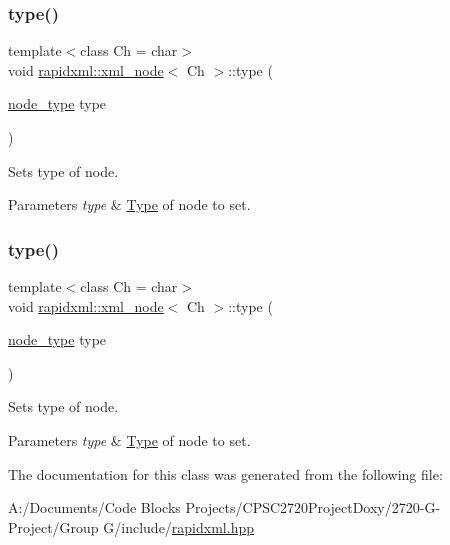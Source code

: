 \subsubsection{\texorpdfstring{type()}{type()}\hspace{0.1cm}{\footnotesize\ttfamily [3/4]}}
{\footnotesize\ttfamily template$<$class Ch = char$>$ \\
void \mbox{\hyperlink{classrapidxml_1_1xml__node}{rapidxml\+::xml\+\_\+node}}$<$ Ch $>$\+::type (\begin{DoxyParamCaption}\item[{\mbox{\hyperlink{namespacerapidxml_abb456db38f7efb746c4330eed6072a7c}{node\+\_\+type}}}]{type }\end{DoxyParamCaption})\hspace{0.3cm}{\ttfamily [inline]}}

Sets type of node. 
\begin{DoxyParams}{Parameters}
{\em type} & \mbox{\hyperlink{class_type}{Type}} of node to set. \\
\hline
\end{DoxyParams}
\mbox{\label{classrapidxml_1_1xml__node_a499bbc9300c1b06821d5c08b24164c68}} 
\subsubsection{\texorpdfstring{type()}{type()}\hspace{0.1cm}{\footnotesize\ttfamily [4/4]}}
{\footnotesize\ttfamily template$<$class Ch = char$>$ \\
void \mbox{\hyperlink{classrapidxml_1_1xml__node}{rapidxml\+::xml\+\_\+node}}$<$ Ch $>$\+::type (\begin{DoxyParamCaption}\item[{\mbox{\hyperlink{namespacerapidxml_abb456db38f7efb746c4330eed6072a7c}{node\+\_\+type}}}]{type }\end{DoxyParamCaption})\hspace{0.3cm}{\ttfamily [inline]}}

Sets type of node. 
\begin{DoxyParams}{Parameters}
{\em type} & \mbox{\hyperlink{class_type}{Type}} of node to set. \\
\hline
\end{DoxyParams}


The documentation for this class was generated from the following file\+:\begin{DoxyCompactItemize}
\item 
A\+:/\+Documents/\+Code Blocks Projects/\+C\+P\+S\+C2720\+Project\+Doxy/2720-\/\+G-\/\+Project/\+Group G/include/\mbox{\hyperlink{include_2rapidxml_8hpp}{rapidxml.\+hpp}}\end{DoxyCompactItemize}
